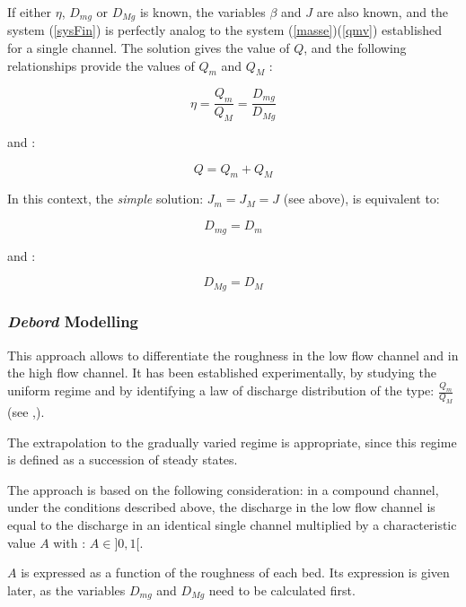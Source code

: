If either $\eta$, $D_{mg}$ or $D_{Mg}$ is known, the variables $\beta$ and $J$ are also known, and the system (\ref{sysFin}) is perfectly analog to the system (\ref{masse})(\ref{qmv}) established for a single channel. The solution gives the value of $Q$, and the following relationships provide the values of $Q_m$ and $Q_M$ :

\begin{equation}
  \eta = \frac{Q_m}{Q_M} = \frac{D_{mg}}{D_{Mg}}
\end{equation}

and :

\begin{equation}
  Q = Q_m + Q_M
\end{equation}

In this context, the \textit{simple} solution: $J_m = J_M = J$ (see above), is equivalent to:

\begin{equation}
  D_{mg} = D_m
\end{equation}

and :

\begin{equation}
  D_{Mg} = D_M
\end{equation}

\subsubsection{\emph{Debord} Modelling} \label{ModDeb}

This approach allows to differentiate the roughness in the low flow channel and in the high flow channel.
It has been established experimentally, by studying the uniform regime
and by identifying a law of discharge distribution of the type: $\frac{Q_m}{Q_M}$ (see \cite{UAN75},\cite{NICOLLET79}).

The extrapolation to the gradually varied regime is appropriate, since this regime is defined as a succession of steady states.

The approach is based on the following consideration: in a compound channel, under the conditions described above, the discharge in the low flow channel is equal to the discharge in an identical single channel multiplied by a characteristic value $A$ with : $A \in ]0,1[$.

$A$ is expressed as a function of the roughness of each bed. Its expression is given later, as the variables $D_{mg}$ and $D_{Mg}$ need to be calculated first.

